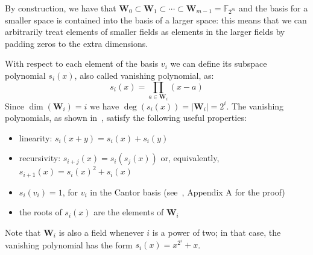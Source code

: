     By construction, we have that $\mathbf{W}_0 \subset \mathbf{W}_1 \subset \cdots \subset \mathbf{W}_{m-1} = \mathds{F}_{2^m}$ 
    and the basis for a smaller space is contained into the basis of a larger space: this means that 
    we can arbitrarily treat elements of smaller fields as elements in the larger fields by padding zeros to the extra dimensions.

    With respect to each element of the basis $v_i$ we can define its subspace polynomial $s_i(x)$, also called vanishing polynomial, as:
    \begin{equation}
        s_i(x) = \prod_{a \in \mathbf{W}_i} (x - a)
        \label{eq:vanishing_polynomial}
    \end{equation}
    Since $\dim(\mathbf{W}_i) = i$ we have $\deg(s_i(x)) = |\mathbf{W}_i| = 2^i$.
    The vanishing polynomials, as shown in~\cite{DBLP:journals/jct/Cantor89,DBLP:journals/tit/GaoM10}, satisfy the following useful properties:
    \begin{itemize}
        \item linearity: $s_i(x+y) = s_i(x) + s_i(y)$
        \item recursivity: $s_{i+j}(x) = s_i(s_j(x))$ or, equivalently, $s_{i+1}(x) = s_i(x)^2+s_i(x)$
        \item $s_i(v_i) = 1$, for $v_i$ in the Cantor basis (see~\cite{DBLP:journals/corr/abs-1708-09746}, Appendix A for the proof)
        \item the roots of $s_i(x)$ are the elements of $\mathbf{W}_i$
    \end{itemize}
    Note that $\mathbf{W}_i$ is also a field whenever $i$ is a power of two; in that case, the vanishing polynomial has the form $s_i(x) = x^{2^i}+x$.

